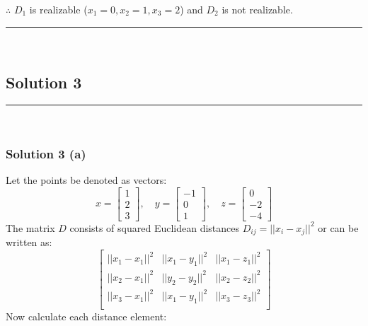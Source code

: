 \documentclass{article}
\begin{document}
\subsubsection*{\normalfont}{$\therefore$ $D_{1}$ is realizable ($x_1=0, x_2=1, x_3=2$) and $D_{2}$ is not realizable.}

\noindent\rule{\textwidth}{0.4pt}\\

\newpage

\subsection*{Solution 3}
\noindent\rule{\textwidth}{0.4pt}\\
\subsubsection*{Solution 3 (a)}
Let the points be denoted as vectors:
\[
x = \begin{bmatrix}1 \\ 2 \\ 3\end{bmatrix}, \quad
y = \begin{bmatrix}-1 \\ 0 \\ 1\end{bmatrix}, \quad
z = \begin{bmatrix}0 \\ -2 \\ -4\end{bmatrix}
\]
The matrix $D$ consists of squared Euclidean distances $D_{ij} =    ||x_i - x_j||^2$ or can be written as:
$$
\begin{bmatrix}
    ||x_1 - x_1||^2 & ||x_1 - y_1||^2 &  ||x_1 - z_1||^2 \\
    ||x_2 - x_1||^2 & ||y_2 - y_2||^2 &  ||x_2 - z_2||^2 \\
    ||x_3 - x_1||^2 & ||x_1 - y_1||^2 &  ||x_3 - z_3||^2 \\
\end{bmatrix}
$$
Now calculate each distance element:
\end{document}
